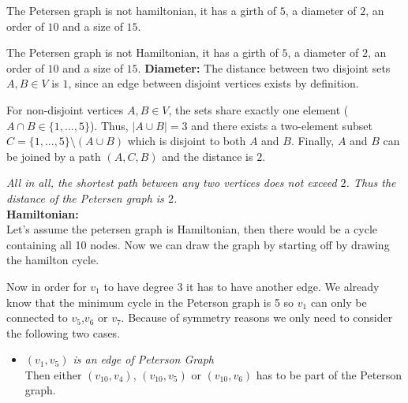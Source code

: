 \documentclass[a4paper]{article}
\begin{document}
\begin{solution}{9}
\begin{theorem}{The Petersen graph is not hamiltonian, it has a girth of $5$, a diameter of $2$, an order of $10$ and a size of $15$.}
\begin{theorem}{The Petersen graph is not Hamiltonian, it has a girth of $5$, a diameter of $2$, an order of $10$ and a size of $15$.}
			\textbf{Diameter:} The distance between two disjoint sets $A, B \in V$ is $1$, since an edge between disjoint vertices exists by definition.
				
				For non-disjoint vertices $A, B \in V$, the sets share exactly one element ($A \cap B \in \{1, ..., 5\}$). Thus, $|A \cup B| = 3$ and there exists a two-element subset $C = \{1, ..., 5\} \setminus (A \cup B)$ which is disjoint to both $A$ and $B$. Finally, $A$ and $B$ can be joined by a path $(A, C, B)$ and the distance is $2$.

				\emph{All in all, the shortest path between any two vertices does not exceed $2$. Thus the distance of the Petersen graph is $2$.}\\

			\textbf{Hamiltonian:} \\
			Let's assume the petersen graph is Hamiltonian, then there would be a cycle containing all 10 nodes. 
			Now we can draw the graph by starting off by drawing the hamilton cycle. 
			\begin{center}
			\end{center}
			Now in order for $v_1$ to have degree 3 it has to have another edge. 
			We already know that the minimum cycle in the Peterson graph is 5 so $v_1$ can only be connected to $v_5$,$v_6$ or $v_7$. 
			Because of symmetry reasons we only need to consider the following two cases. 
			\begin{itemize}
				\item \emph{$(v_1,v_5)$ is an edge of Peterson Graph}\\
					Then either $(v_{10},v_4)$, $(v_{10},v_5)$ or $(v_{10},v_6)$ has to be part of the Peterson graph. 

\end{itemize}
\end{theorem}
\end{theorem}
\end{solution}
\end{document}
